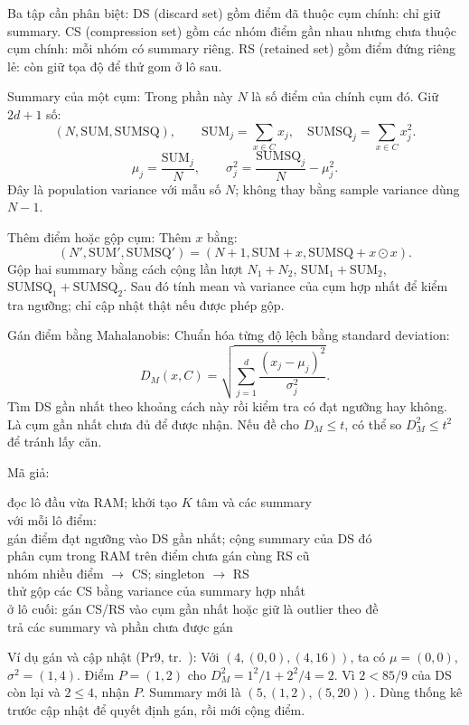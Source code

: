 \documentclass[10pt,a4paper,twocolumn]{article}
\makeatletter
\newcommand{\key}[1]{#1:\enspace}
\newenvironment{algpseudo}{%
  \par\addvspace{2pt}\noindent
  \setlength{\parskip}{0pt}%
  Mã giả:\par\nobreak
  \begin{list}{}{\setlength{\leftmargin}{1em}\setlength{\topsep}{0pt}%
    \setlength{\partopsep}{0pt}\setlength{\parsep}{0pt}%
    \@beginparpenalty=10000\relax}%
  \item\relax
}{\end{list}\par\addvspace{3pt}}
\makeatother
\begin{document}
\key{Ba tập cần phân biệt} DS (discard set) gồm điểm đã thuộc cụm chính: chỉ giữ summary. CS (compression set) gồm các nhóm điểm gần nhau nhưng chưa thuộc cụm chính: mỗi nhóm có summary riêng. RS (retained set) gồm điểm đứng riêng lẻ: còn giữ tọa độ để thử gom ở lô sau.

\key{Summary của một cụm} Trong phần này $N$ là số điểm của chính cụm đó. Giữ $2d+1$ số:
\[
(N,\mathrm{SUM},\mathrm{SUMSQ}),\qquad
\mathrm{SUM}_j=\sum_{x\in C}x_j,\quad
\mathrm{SUMSQ}_j=\sum_{x\in C}x_j^2.
\]
\[
\mu_j=\frac{\mathrm{SUM}_j}{N},\qquad
\sigma_j^2=\frac{\mathrm{SUMSQ}_j}{N}-\mu_j^2.
\]
Đây là population variance với mẫu số $N$; không thay bằng sample variance dùng $N-1$.

\key{Thêm điểm hoặc gộp cụm} Thêm $x$ bằng:
\[
(N',\mathrm{SUM}',\mathrm{SUMSQ}')
=(N+1,\mathrm{SUM}+x,\mathrm{SUMSQ}+x\odot x).
\]
Gộp hai summary bằng cách cộng lần lượt $N_1+N_2$, $\mathrm{SUM}_1+\mathrm{SUM}_2$, $\mathrm{SUMSQ}_1+\mathrm{SUMSQ}_2$. Sau đó tính mean và variance của cụm hợp nhất để kiểm tra ngưỡng; chỉ cập nhật thật nếu được phép gộp.

\key{Gán điểm bằng Mahalanobis} Chuẩn hóa từng độ lệch bằng standard deviation:
\[
D_M(x,C)=\sqrt{\sum_{j=1}^d\frac{(x_j-\mu_j)^2}{\sigma_j^2}}.
\]
Tìm DS gần nhất theo khoảng cách này rồi kiểm tra có đạt ngưỡng hay không. Là cụm gần nhất chưa đủ để được nhận. Nếu đề cho $D_M\le t$, có thể so $D_M^2\le t^2$ để tránh lấy căn.

\begin{algpseudo}
đọc lô đầu vừa RAM; khởi tạo $K$ tâm và các summary\\
với mỗi lô điểm:\\
\quad gán điểm đạt ngưỡng vào DS gần nhất; cộng summary của DS đó\\
\quad phân cụm trong RAM trên điểm chưa gán cùng RS cũ\\
\quad nhóm nhiều điểm $\to$ CS; singleton $\to$ RS\\
\quad thử gộp các CS bằng variance của summary hợp nhất\\
ở lô cuối: gán CS/RS vào cụm gần nhất hoặc giữ là outlier theo đề\\
trả các summary và phần chưa được gán
\end{algpseudo}

\key{Ví dụ gán và cập nhật (Pr9, tr.~\pageref*{question:Pr9})} Với $(4,(0,0),(4,16))$, ta có $\mu=(0,0)$, $\sigma^2=(1,4)$. Điểm $P=(1,2)$ cho $D_M^2=1^2/1+2^2/4=2$. Vì $2<85/9$ của DS còn lại và $2\le4$, nhận $P$. Summary mới là $(5,(1,2),(5,20))$. Dùng thống kê trước cập nhật để quyết định gán, rồi mới cộng điểm.
\end{document}
